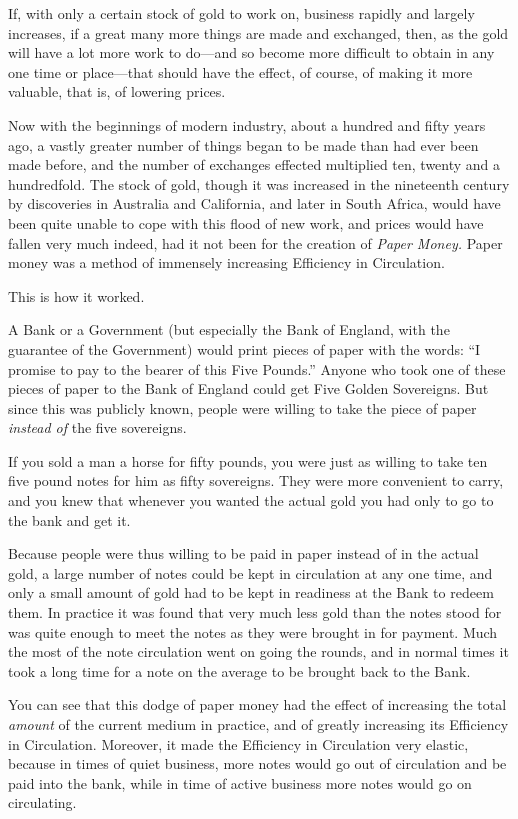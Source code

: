 \documentclass{book}
\begin{document}
If, with only a certain stock of gold to work on, business rapidly and largely increases, if a great many more things are made and exchanged, then, as the gold will have a lot more work to do—and so become more difficult to obtain in any one time or place—that should have the effect, of course, of making it more valuable, that is, of lowering prices.

Now with the beginnings of modern industry, about a hundred and fifty years ago, a vastly greater number of things began to be made than had ever been made before, and the number of exchanges effected multiplied ten, twenty and a hundredfold. The stock of gold, though it was increased in the nineteenth century by discoveries in Australia and California, and later in South Africa, would have been quite unable to cope with this flood of new work, and prices would have fallen very much indeed, had it not been for the creation of \emph{Paper Money.} Paper money was a method of immensely increasing Efficiency in Circulation.

This is how it worked.

A Bank or a Government (but especially the Bank of England, with the guarantee of the Government) would print pieces of paper with the words: “I promise to pay to the bearer of this Five Pounds.” Anyone who took one of these pieces of paper to the Bank of England could get Five Golden Sovereigns. But since this was publicly known, people were willing to take the piece of paper \emph{instead of} the five sovereigns.

If you sold a man a horse for fifty pounds, you were just as willing to take ten five pound notes for him as fifty sovereigns. They were more convenient to carry, and you knew that whenever you wanted the actual gold you had only to go to the bank and get it.

Because people were thus willing to be paid in paper instead of in the actual gold, a large number of notes could be kept in circulation at any one time, and only a small amount of gold had to be kept in readiness at the Bank to redeem them. In practice it was found that very much less gold than the notes stood for was quite enough to meet the notes as they were brought in for payment. Much the most of the note circulation went on going the rounds, and in normal times it took a long time for a note on the average to be brought back to the Bank.

You can see that this dodge of paper money had the effect of increasing the total \emph{amount} of the current medium in practice, and of greatly increasing its Efficiency in Circulation. Moreover, it made the Efficiency in Circulation very elastic, because in times of quiet business, more notes would go out of circulation and be paid into the bank, while in time of active business more notes would go on circulating.
\end{document}
